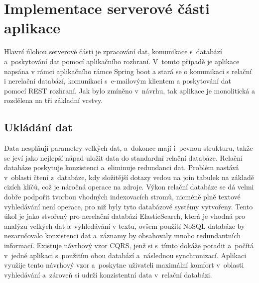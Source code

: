 \section{Implementace serverové části aplikace}
 Hlavní úlohou serverové části je zpracování dat, komunikace s~databází a~poskytování dat pomocí aplikačního rozhraní. V~tomto případě je aplikace napsána v rámci aplikačního rámce Spring boot a stará se o komunikaci s relační i nerelační databází, komunikaci s~e\mbox{-mailovým} klientem a poskytování dat pomocí REST rozhraní. Jak bylo zmíněno v~návrhu, tak aplikace je monolitická a rozdělena na tři základní vrstvy.

\subsection{Ukládání dat}
Data nesplňují parametry velkých dat, a~dokonce mají i~pevnou strukturu, takže se jeví jako nejlepší nápad uložit data do standardní relační databáze. Relační databáze poskytuje konzistenci a~eliminuje redundanci dat. Problém nastává v~oblasti čtení z~databáze, kdy složitější dotazy vedou na join tabulek na základě cizích klíčů, což je náročná operace na zdroje. Výkon relační databáze se dá velmi dobře podpořit tvorbou vhodných indexovacích stromů, nicméně plně textové vyhledávání není operace, pro niž byly tyto databázové systémy vytvořeny. Tento úkol je jako stvořený pro nerelační databázi ElasticSearch, která je vhodná pro analýzu velkých dat a~vyhledávání v textu, ovšem použití NoSQL databáze by nezaručovalo konzistenci dat a~záznamy by obsahovaly mnoho redundantních informací. Existuje návrhový vzor CQRS, jenž si s~tímto dokáže poradit a~počítá v~jedné aplikaci s~použitím obou databází a~následnou synchronizací. Aplikaci využije tento návrhový vzor a~poskytne uživateli maximální komfort v~oblasti vyhledávání a~zároveň si udrží konzistentní data v~relační databázi.


